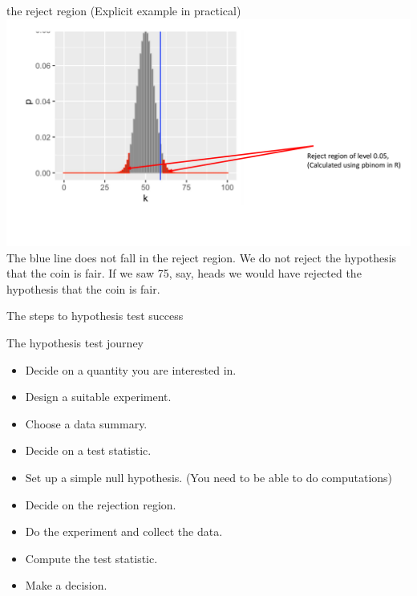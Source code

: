 \documentclass{bredelebeamer}
\begin{document}
\begin{frame}{the reject region}
(Explicit example in practical)
\includegraphics[width=1\textwidth]{rejectregion}
The blue line does not fall in the reject region. We do not reject the hypothesis that the coin is fair. If we saw 75, say, heads we would have rejected the hypothesis that the coin is fair.
\end{frame}


\begin{frame}{The steps to hypothesis test success }
\begin{block}{The hypothesis test journey}
	
	\begin{itemize}
		\item Decide on a quantity you are interested in.
		
		\item Design a suitable experiment.
		
		\item Choose a data summary. 
		
		\item Decide on a test statistic.
		
		\item Set up a simple null hypothesis. (You need to be able to do computations)
		
		\item Decide on the rejection region.
		
		\item Do the experiment and collect the data.
		
		\item Compute the test statistic.
		
		\item Make a decision.
	\end{itemize}

\end{block}
\end{frame}
\end{document}
